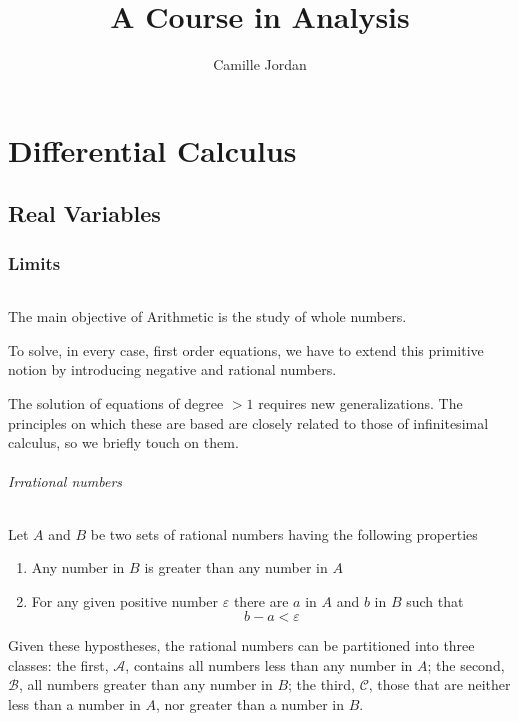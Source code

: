 \documentclass[10pt,letterpaper]{book}
\title{A Course in Analysis}
\author{Camille Jordan}
\renewcommand\epsilon{\varepsilon}
\theoremstyle{definition}
\begin{document}
\maketitle
\tableofcontents


\part{Differential Calculus}

\chapter{Real Variables}

\section{Limits}

\paragraph{} 
The main objective of Arithmetic is the study of whole numbers.

To solve, in every case, first order equations, we have to extend this primitive notion by introducing negative and rational numbers.

The solution of equations of degree $> 1$ requires new generalizations. The principles on which these are based are closely related to those of infinitesimal calculus, so we briefly touch on them.


\paragraph{Irrational numbers}\label{par:irrational-numbers} Let $A$ and $B$ be two sets of rational numbers having the following properties
\begin{enumerate}
\item Any number in $B$ is greater than any number in $A$
\item For any given positive number $\epsilon$ there are $a$ in $A$ and $b$ in $B$ such that
\[
  b - a < \epsilon
\]
\end{enumerate}
Given these hypostheses, the rational numbers can be partitioned into three classes: the first, $\mathcal{A}$, contains all numbers less than any number in $A$; the second, $\mathcal B$, all numbers greater than any number in $B$; the third, $\mathcal C$, those that are neither less than a number in $A$, nor greater than a number in $B$.
\end{document}
